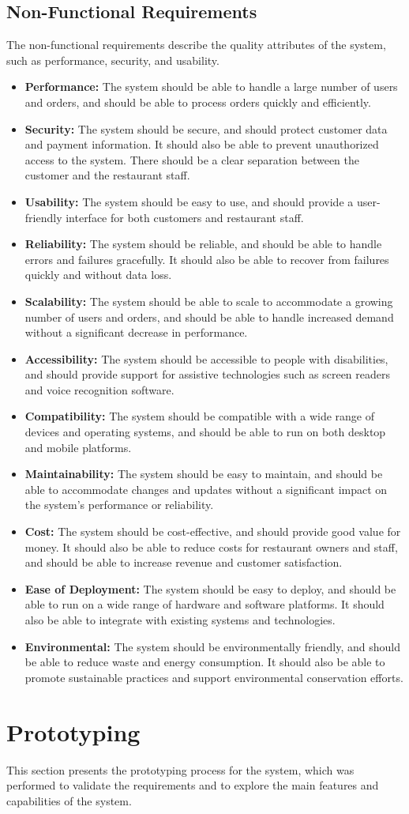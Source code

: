 \subsection*{Non-Functional Requirements}
The non-functional requirements describe the quality attributes of the system, such as performance, security, and usability.

\begin{itemize}
    \item \textbf{Performance:} The system should be able to handle a large number of users and orders, and should be able to process orders quickly and efficiently.
    \item \textbf{Security:} The system should be secure, and should protect customer data and payment information. It should also be able to prevent unauthorized access to the system. There should be a clear separation between the customer and the restaurant staff.
    \item \textbf{Usability:} The system should be easy to use, and should provide a user-friendly interface for both customers and restaurant staff.
    \item \textbf{Reliability:} The system should be reliable, and should be able to handle errors and failures gracefully. It should also be able to recover from failures quickly and without data loss.
    \item \textbf{Scalability:} The system should be able to scale to accommodate a growing number of users and orders, and should be able to handle increased demand without a significant decrease in performance.
    \item \textbf{Accessibility:} The system should be accessible to people with disabilities, and should provide support for assistive technologies such as screen readers and voice recognition software.
    \item \textbf{Compatibility:} The system should be compatible with a wide range of devices and operating systems, and should be able to run on both desktop and mobile platforms.
    \item \textbf{Maintainability:} The system should be easy to maintain, and should be able to accommodate changes and updates without a significant impact on the system's performance or reliability.
    \item \textbf{Cost:} The system should be cost-effective, and should provide good value for money. It should also be able to reduce costs for restaurant owners and staff, and should be able to increase revenue and customer satisfaction.
    \item \textbf{Ease of Deployment:} The system should be easy to deploy, and should be able to run on a wide range of hardware and software platforms. It should also be able to integrate with existing systems and technologies.
    \item \textbf{Environmental:} The system should be environmentally friendly, and should be able to reduce waste and energy consumption. It should also be able to promote sustainable practices and support environmental conservation efforts.
    
\end{itemize}

\section{Prototyping}
This section presents the prototyping process for the system, which was performed to validate the requirements and to explore the main features and capabilities of the system.
